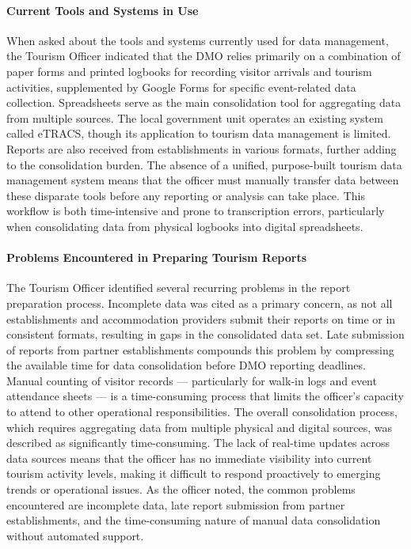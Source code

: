 \documentclass{research}
\begin{document}

\paragraph{Current Tools and Systems in Use}

When asked about the tools and systems currently used for data management, the
Tourism Officer indicated that the DMO relies primarily on a combination of
paper forms and printed logbooks for recording visitor arrivals and tourism
activities, supplemented by Google Forms for specific event-related data
collection. Spreadsheets serve as the main consolidation tool for aggregating
data from multiple sources. The local government unit operates an existing
system called eTRACS, though its application to tourism data management is
limited. Reports are also received from establishments in various formats,
further adding to the consolidation burden. The absence of a unified,
purpose-built tourism data management system means that the officer must manually
transfer data between these disparate tools before any reporting or analysis
can take place. This workflow is both time-intensive and prone to transcription
errors, particularly when consolidating data from physical logbooks into digital
spreadsheets.


\paragraph{Problems Encountered in Preparing Tourism Reports}

The Tourism Officer identified several recurring problems in the report
preparation process. Incomplete data was cited as a primary concern, as not
all establishments and accommodation providers submit their reports on time or
in consistent formats, resulting in gaps in the consolidated data set. Late
submission of reports from partner establishments compounds this problem by
compressing the available time for data consolidation before DMO reporting
deadlines. Manual counting of visitor records --- particularly for walk-in logs
and event attendance sheets --- is a time-consuming process that limits the
officer's capacity to attend to other operational responsibilities. The overall
consolidation process, which requires aggregating data from multiple physical
and digital sources, was described as significantly time-consuming. The lack of
real-time updates across data sources means that the officer has no immediate
visibility into current tourism activity levels, making it difficult to respond
proactively to emerging trends or operational issues. As the officer noted, the
common problems encountered are incomplete data, late report submission from
partner establishments, and the time-consuming nature of manual data
consolidation without automated support.
\end{document}
